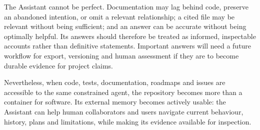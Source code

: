 The Assistant cannot be perfect. Documentation may lag behind code, preserve
an abandoned intention, or omit a relevant relationship; a cited file may be
relevant without being sufficient; and an answer can be accurate without being
optimally helpful. Its answers should therefore be treated as informed,
inspectable accounts rather than definitive statements. Important answers will
need a future workflow for export, versioning and human assessment if they are
to become durable evidence for project claims.

Nevertheless, when code, tests, documentation, roadmaps and issues are
accessible to the same constrained agent, the repository becomes more than a
container for software. Its external memory becomes actively usable: the
Assistant can help human collaborators and users navigate current behaviour,
history, plans and limitations, while making its evidence available for
inspection.
